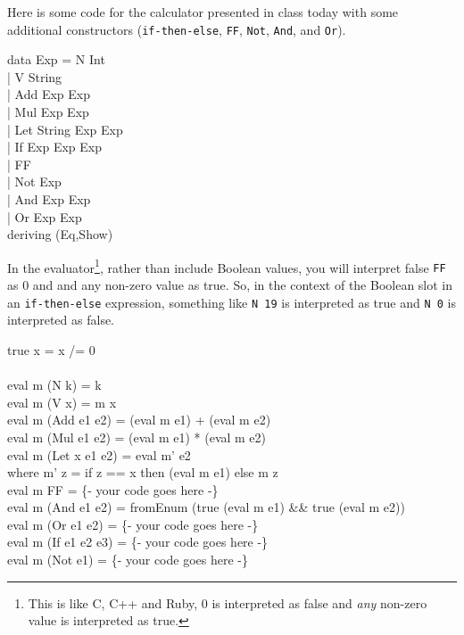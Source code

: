 \documentclass[11pt]{article}
\begin{document}

Here is some code for the calculator presented in class today with some
additional constructors ({\tt{if-then-else}}, {\tt{FF}}, {\tt{Not}},
{\tt{And}}, and {\tt{Or}}).    

\begin{program*}

\>  data Exp = N Int  \\  
\>           | V String  \\  
\>           | Add Exp Exp  \\  
\>           | Mul Exp Exp  \\  
\>           | Let String Exp Exp  \\  
\>           | If Exp Exp Exp  \\  
\>           | FF  \\  
\>           | Not Exp  \\  
\>           | And Exp Exp  \\  
\>           | Or Exp Exp \\  
\>    deriving (Eq,Show) \\  
\end{program*}

In the evaluator\footnote{This is like C, C++ and Ruby, 0 is interpreted as
false and {\em{any}} non-zero value is interpreted as true.}, rather than
include Boolean values, you will interpret false {\tt{FF}} as 0 and and any
non-zero value as true.  So, in the context of the Boolean slot in an
{\tt{if-then-else}} expression, something like {\tt{N 19}} is interpreted as
true and {\tt{N 0}} is interpreted as false.  

\begin{program*}
\>  true x = x /= 0 \\  
\> \\
\>  eval m (N k) = k \\  
\>  eval m (V x) = m x  \\  
\>  eval m (Add e1 e2) = (eval m e1) + (eval m e2) \\  
\>  eval m (Mul e1 e2) = (eval m e1) * (eval m e2) \\  
\>  eval m (Let x e1 e2) = eval m' e2 \\  
\>    where m' z = if z == x then (eval m e1) else m z \\  
\>  eval m FF = \{- your code goes here -\}  \\  
\>  eval m (And e1 e2) = fromEnum (true (eval m e1) \&\&  true (eval m e2)) \\  
\>  eval m (Or e1 e2) =  \{- your code goes here -\}   \\  
\>  eval m (If e1 e2 e3) = \{- your code goes here -\}  \\  
\>  eval m (Not e1) = \{- your code goes here -\}  \\  

\end{program*}
\end{document}
